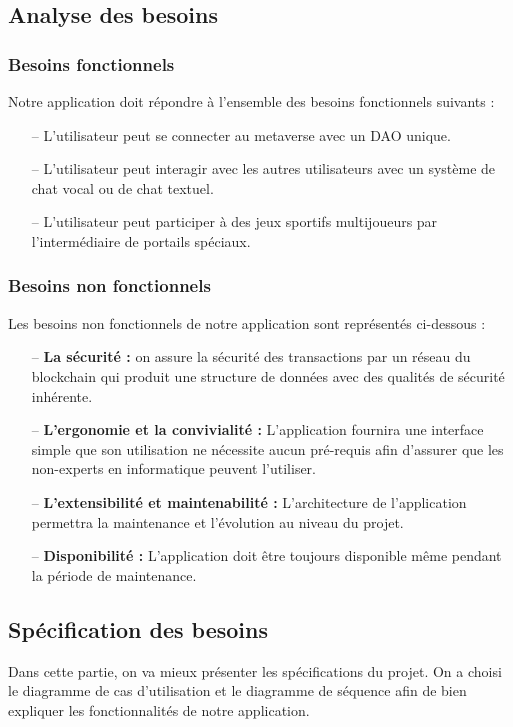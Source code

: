 \documentclass[12pt,a4paper,oneside,french]{book}
\begin{document}
\subsection{Analyse des besoins}
\subsubsection*{Besoins fonctionnels}
Notre application doit répondre à l’ensemble des besoins fonctionnels suivants : 
\begin{itemize}
\item[--] L’utilisateur peut se connecter au metaverse avec un DAO unique.
\item[--] L’utilisateur peut interagir avec les autres utilisateurs avec un système de chat vocal ou de
chat textuel.
\item[--] L’utilisateur peut participer à des jeux sportifs multijoueurs par l’intermédiaire de portails
spéciaux.
\end{itemize}

\subsubsection*{Besoins non fonctionnels}
Les besoins non fonctionnels de notre application sont représentés ci-dessous :
\begin{itemize}
\item[--] \textbf{La sécurité :} on assure la sécurité des transactions par un réseau du blockchain qui
produit une structure de données avec des qualités de sécurité inhérente.
\item[--] \textbf{L’ergonomie et la convivialité :} L’application fournira une interface simple que son
utilisation ne nécessite aucun pré-requis afin d’assurer que les non-experts en informatique
peuvent l’utiliser.
\item[--] \textbf{L’extensibilité et maintenabilité :} L’architecture de l’application permettra la maintenance
et l’évolution au niveau du projet.
\item[--] \textbf{Disponibilité :} L’application doit être toujours disponible même pendant la période de
maintenance.
\end{itemize}

\subsection{Spécification des besoins}
Dans cette partie, on va mieux présenter les spécifications du projet. On a choisi le diagramme de cas d’utilisation et le diagramme de séquence afin de bien expliquer les fonctionnalités
de notre application.
\end{document}
